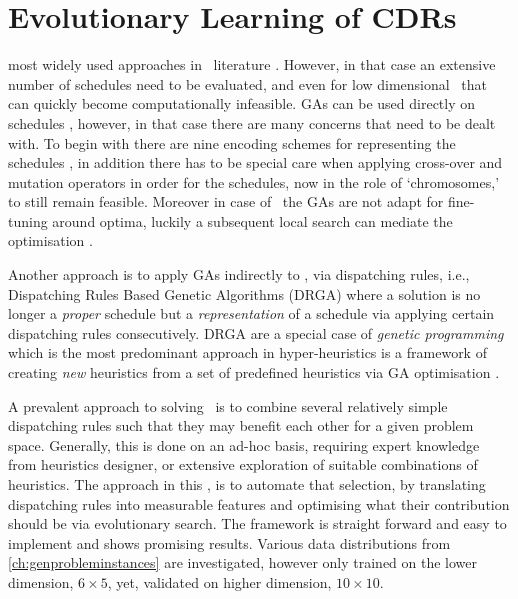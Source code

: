 

\chapter{Evolutionary Learning of CDRs}\label{ch:esmodels} 


 most widely used approaches in \JSP\ literature \citep{Pinedo08}. However, in that case an extensive number of schedules need to be evaluated, and even for low dimensional \JSP\ that can quickly become computationally infeasible.
GAs can be used directly on schedules \citep{Cheng96,Cheng99,Tsai07,Qing-dao-er-ji12,Ak12,Meeran12}, however, in that case there are many concerns that need to be dealt with. To begin with there are nine encoding schemes for representing the schedules \cite{Cheng96}, in addition there has to be special care when applying cross-over and mutation operators in order for the schedules, now in the role of `chromosomes,' to still remain feasible. Moreover in case of \JSP\ the GAs are not adapt for fine-tuning around optima, luckily a subsequent local search can mediate the optimisation \citep{Cheng99,Meeran12}.

Another approach is to apply GAs indirectly to \JSP , via dispatching rules, i.e., Dispatching Rules Based Genetic Algorithms (DRGA) \citep{Vazquez-Rodriguez09,Dhingra10,Nguyen13} where a solution is no longer a \emph{proper} schedule but a \emph{representation} of a schedule via applying certain dispatching rules consecutively. 
DRGA are a special case of \emph{genetic programming} \citep{Koza05} which is the most predominant approach in hyper-heuristics is a framework of creating \emph{new} heuristics from a set of  predefined heuristics via GA optimisation \citep{Burke10}. 

A prevalent approach to solving \JSP\ is to combine several relatively simple dispatching rules such that they may benefit each other for a given problem space. Generally, this is done on an ad-hoc basis, requiring expert knowledge from heuristics designer, or extensive exploration of suitable combinations of heuristics. The approach in this , is to automate that selection, by translating dispatching rules into measurable features and optimising what their contribution should be via evolutionary search. The framework is straight forward and easy to implement and shows promising results. Various data distributions from \cref{ch:genprobleminstances} are investigated, however only trained on the lower dimension, $6\times5$, yet, validated on higher dimension, $10\times10$. 

